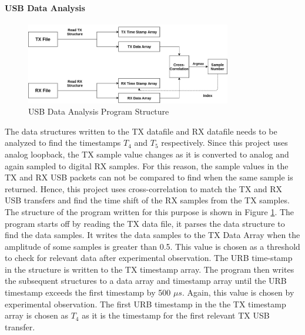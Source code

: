 \paragraph{USB Data Analysis}
\begin{figure}[h!]
\centering
\includegraphics[width=0.8\textwidth]{Thesis/Figure/data_corr.png}
\caption{USB Data Analysis Program Structure}
\label{usb_analysis}
\end{figure}

The data structures written to the TX datafile and RX datafile needs to be analyzed to find the timestamps $T_4$ and $T_5$ respectively.
Since this project uses analog loopback, the TX sample value changes as it is converted to analog and again  sampled to digital RX samples.
For this reason, the sample values in the TX and RX USB packets can not be compared to find when the same sample is returned.
Hence, this project uses cross-correlation to match the TX and RX USB transfers and find the time shift of the RX samples from the TX samples.\\

The structure of the program written for this purpose is shown in Figure \ref{usb_analysis}.
The program starts off by reading the TX data file, it parses the data structure to find the data samples.
It writes the data samples to the TX Data Array when the amplitude of some samples is greater than 0.5.
This value is chosen as a threshold to check for relevant data after experimental observation.
The URB time-stamp in the structure is written to the TX timestamp array.
The program then writes the subsequent structures to a data array and timestamp array until the URB timestamp exceeds the first timestamp by 500 $\mu s$.
Again, this value is chosen by experimental observation.
The first URB timestamp in the the TX timestamp array is chosen as $T_4$ as it is the timestamp for the first relevant TX \ac{USB} transfer.\\

